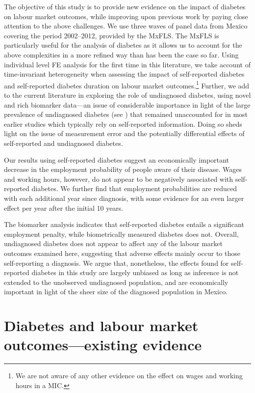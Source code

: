 The objective of this study is to provide new evidence on the impact of diabetes on labour market outcomes, while improving upon previous work by paying close attention to the above challenges. We use three waves of panel data from Mexico covering the period 2002--2012, provided by the \ac{MxFLS}. The \ac{MxFLS} is particularly useful for the analysis of diabetes as it allows us to account for the above complexities in a more refined way than has been the case so far. Using individual level \ac{FE} analysis for the first time in this literature, we take account of time-invariant heterogeneity when assessing the impact of self-reported diabetes and self-reported diabetes duration on labour market outcomes.\footnote{We are not aware of any other evidence on the effect on wages and working hours in a \ac{MIC}.} Further, we add to the current literature in exploring the role of undiagnosed diabetes, using novel and rich biomarker data---an issue of considerable importance in light of the large prevalence of undiagnosed diabetes (see \textcite{Beagley2014}) that remained unaccounted for in most earlier studies which typically rely on self-reported information. Doing so sheds light on the issue of measurement error and the potentially differential effects of self-reported and undiagnosed diabetes. 

Our results using self-reported diabetes suggest an economically important decrease in the employment probability of people aware of their disease. Wages and working hours, however, do not appear to be negatively associated with self-reported diabetes. We further find that employment probabilities are reduced with each additional year since diagnosis, with some evidence for an even larger effect per year after the initial 10 years. 

The biomarker analysis indicates that self-reported diabetes entails a significant employment penalty, while biometrically measured diabetes does not. Overall, undiagnosed diabetes does not appear to affect any of the labour market outcomes examined here, suggesting that adverse effects mainly occur to those self-reporting a diagnosis. We argue that, nonetheless, the effects found for self-reported diabetes in this study are largely unbiased as long as inference is not extended to the unobserved undiagnosed population, and are economically important in light of the sheer size of the diagnosed population in Mexico.


\section{\label{sec:labour  outcomes and diabetes literature}Diabetes and labour market outcomes---existing evidence}


